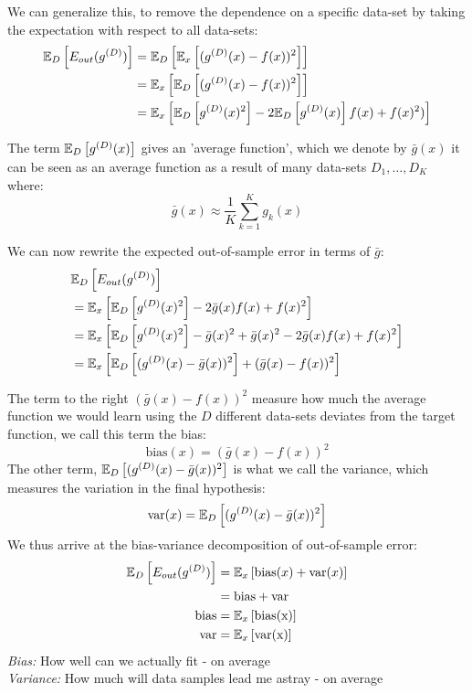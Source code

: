     We can generalize this, to remove the dependence on a specific data-set by 
    taking the expectation with respect to all data-sets:
    \begin{align*}
        \mathbb{E}_D\left[E_{out}(g^{(D)})\right] &=
        \mathbb{E}_D\left[\mathbb{E}_x\left[(g^{(D)}(x)-f(x))^2\right]\right]\\
            &= \mathbb{E}_x\left[\mathbb{E}_D\left[(g^{(D)}(x)-f(x))^2\right]\right]\\
            &= \mathbb{E}_x\left[\mathbb{E}_D\left[g^{(D)}(x)^2\right] - 
            2\mathbb{E}_D\left[g^{(D)}(x)\right]f(x)+f(x)^2)\right]
    \end{align*}
    
    The term $\mathbb{E}_D\left[g^{(D)}(x)\right]$ gives an 'average function', which 
    we denote by $\bar{g}(x)$ it can be seen as an average function as a result 
    of many data-sets $D_1,\dots,D_K$ where:
    \begin{equation}
        \bar{g}(x)\approx \frac{1}{K} \sum_{k=1}^{K}g_k(x)
    \end{equation}
    
    We can now rewrite the expected out-of-sample error in terms of $\bar{g}$:
    \begin{align*}
        &\mathbb{E}_D\left[E_{out}(g^{(D)})\right]\\
        &=\mathbb{E}_x\left[\mathbb{E}_D\left[g^{(D)}(x)^2\right] - 2\bar{g}(x)f(x)+ 
        f(x)^2\right]\\
        &=\mathbb{E}_x\left[\mathbb{E}_D\left[g^{(D)}(x)^2\right]-\bar{g}(x)^2 + \bar{g}(x)^2 
        - 2\bar{g}(x)f(x)+f(x)^2\right]\\
        &=\mathbb{E}_x\left[\mathbb{E}_D\left[(g^{(D)}(x) - \bar{g}(x))^2\right] + 
        (\bar{g}(x)-f(x))^2\right]
    \end{align*}
    
    The term to the right $(\bar{g}(x)-f(x))^2$ measure how much the average 
    function we would learn using the $D$ different data-sets deviates from the 
    target function, we call this term the bias:
    \begin{equation*}
        \text{bias}(x)=(\bar{g}(x)-f(x))^2
    \end{equation*}
    The other term, $\mathbb{E}_D\left[(g^{(D)}(x)-\bar{g}(x))^2\right]$ is what we 
    call the variance, which measures the variation in the final hypothesis:
    \begin{equation}
        \text{var}(x)=\mathbb{E}_D\left[(g^{(D)}(x)-\bar{g}(x))^2\right]
    \end{equation}
    We thus arrive at the bias-variance decomposition of out-of-sample error:
    \begin{align*}
        \mathbb{E}_D\left[E_{out}(g^{(D)})\right] &= \mathbb{E}_x\left[\text{bias}(x) + 
        \text{var}(x)\right]\\
            &= \text{bias} + \text{var}\\
        \text{bias} &= \mathbb{E}_x\left[\text{bias(x)}\right]\\
        \text{var} &= \mathbb{E}_x\left[\text{var(x)}\right]
    \end{align*}
    \textit{Bias:} How well can we actually fit - on average\\
    \textit{Variance:} How much will data samples lead me astray - on average
    
